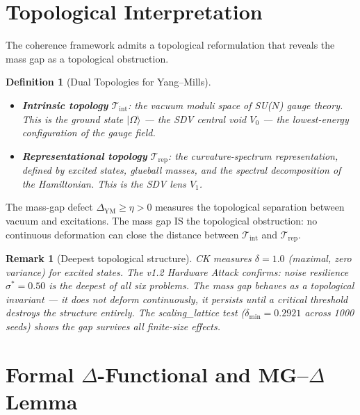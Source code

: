 \documentclass[11pt]{article}
\newtheorem{definition}[theorem]{Definition}
\newtheorem{remark}[theorem]{Remark}
\begin{document}
\section{Topological Interpretation}
\label{sec:topology}

The coherence framework admits a topological reformulation that reveals
the mass gap as a topological obstruction.

\begin{definition}[Dual Topologies for Yang--Mills]
\label{def:ym-topo}
\mbox{}
\begin{itemize}
\item \textbf{Intrinsic topology} $\mathcal{T}_{\mathrm{int}}$:
the vacuum moduli space of SU($N$) gauge theory.  This is the ground
state $|\Omega\rangle$ --- the SDV central void $V_0$ --- the
lowest-energy configuration of the gauge field.
\item \textbf{Representational topology} $\mathcal{T}_{\mathrm{rep}}$:
the curvature-spectrum representation, defined by excited states,
glueball masses, and the spectral decomposition of the Hamiltonian.
This is the SDV lens $V_1$.
\end{itemize}
\end{definition}

\noindent
The mass-gap defect $\Delta_{\mathrm{YM}} \geq \eta > 0$ measures
the topological separation between vacuum and excitations.  The mass
gap IS the topological obstruction: no continuous deformation can close
the distance between $\mathcal{T}_{\mathrm{int}}$ and
$\mathcal{T}_{\mathrm{rep}}$.

\begin{remark}[Deepest topological structure]
CK measures $\delta = 1.0$ (maximal, zero variance) for excited
states.  The v1.2 Hardware Attack confirms: noise resilience
$\sigma^* = 0.50$ is the deepest of all six problems.  The mass gap
behaves as a topological invariant --- it does not deform continuously,
it persists until a critical threshold destroys the structure entirely.
The scaling\_lattice test ($\delta_{\min} = 0.2921$ across 1000 seeds)
shows the gap survives all finite-size effects.
\end{remark}

\section{Formal $\Delta$-Functional and MG--$\Delta$ Lemma}
\label{sec:delta-functional}
\end{document}
